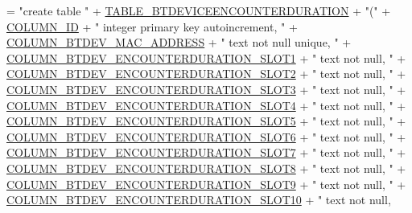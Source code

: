 \begin{DoxyCode}
= \textcolor{stringliteral}{"create table "}
            + \hyperlink{classcs_1_1nsense_1_1db_1_1_n_sense_s_q_lite_helper_ab6eb6aa729d331481384549e53844fac}{TABLE\_BTDEVICEENCOUNTERDURATION} + \textcolor{stringliteral}{"("}
            + \hyperlink{classcs_1_1nsense_1_1db_1_1_n_sense_s_q_lite_helper_a42c92e67b4392524cb4f6bf4c4da4c79}{COLUMN\_ID} + \textcolor{stringliteral}{" integer primary key autoincrement, "}
            + \hyperlink{classcs_1_1nsense_1_1db_1_1_n_sense_s_q_lite_helper_a66d760b81948efc86eafb0bb5147c2a5}{COLUMN\_BTDEV\_MAC\_ADDRESS} + \textcolor{stringliteral}{" text not null unique, "}
            + \hyperlink{classcs_1_1nsense_1_1db_1_1_n_sense_s_q_lite_helper_a76beab73c4c6dca4fc15c556da95a7c2}{COLUMN\_BTDEV\_ENCOUNTERDURATION\_SLOT1} + \textcolor{stringliteral}{" text not null, "}
            + \hyperlink{classcs_1_1nsense_1_1db_1_1_n_sense_s_q_lite_helper_a04ffdeacd409f6b6b262eef50f604ad0}{COLUMN\_BTDEV\_ENCOUNTERDURATION\_SLOT2} + \textcolor{stringliteral}{" text not null, "}
            + \hyperlink{classcs_1_1nsense_1_1db_1_1_n_sense_s_q_lite_helper_ac14029ad8e6146869a054ab91a60feb3}{COLUMN\_BTDEV\_ENCOUNTERDURATION\_SLOT3} + \textcolor{stringliteral}{" text not null, "}
            + \hyperlink{classcs_1_1nsense_1_1db_1_1_n_sense_s_q_lite_helper_ac7af5b84e77b2347356b23528559710b}{COLUMN\_BTDEV\_ENCOUNTERDURATION\_SLOT4} + \textcolor{stringliteral}{" text not null, "}
            + \hyperlink{classcs_1_1nsense_1_1db_1_1_n_sense_s_q_lite_helper_afb2a5bc1f52052963cba23e23925ceca}{COLUMN\_BTDEV\_ENCOUNTERDURATION\_SLOT5} + \textcolor{stringliteral}{" text not null, "}
            + \hyperlink{classcs_1_1nsense_1_1db_1_1_n_sense_s_q_lite_helper_a5498bb02155437579e204a588d142230}{COLUMN\_BTDEV\_ENCOUNTERDURATION\_SLOT6} + \textcolor{stringliteral}{" text not null, "}
            + \hyperlink{classcs_1_1nsense_1_1db_1_1_n_sense_s_q_lite_helper_acdaa8699a82f7ea888a163130e00b0f6}{COLUMN\_BTDEV\_ENCOUNTERDURATION\_SLOT7} + \textcolor{stringliteral}{" text not null, "}
            + \hyperlink{classcs_1_1nsense_1_1db_1_1_n_sense_s_q_lite_helper_a8c6784f810d8c7bb70d0864e9c389f43}{COLUMN\_BTDEV\_ENCOUNTERDURATION\_SLOT8} + \textcolor{stringliteral}{" text not null, "}
            + \hyperlink{classcs_1_1nsense_1_1db_1_1_n_sense_s_q_lite_helper_a67878d3b8c7fd4fef8e3a50147ee8f80}{COLUMN\_BTDEV\_ENCOUNTERDURATION\_SLOT9} + \textcolor{stringliteral}{" text not null, "}
            + \hyperlink{classcs_1_1nsense_1_1db_1_1_n_sense_s_q_lite_helper_a7a292db5cf93e4b1583ca56267cabaab}{COLUMN\_BTDEV\_ENCOUNTERDURATION\_SLOT10} + \textcolor{stringliteral}{" text not null,
}
\end{DoxyCode}
